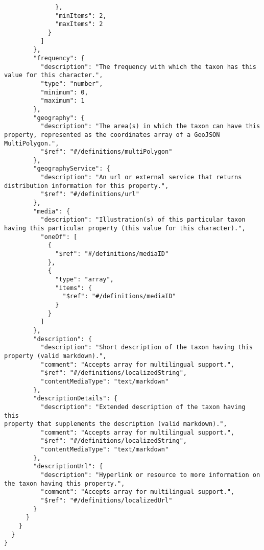 \documentclass[10pt,letterpaper]{article}
\begin{document}
\begin{verbatim}
              },
              "minItems": 2,
              "maxItems": 2
            }
          ]
        },
        "frequency": {
          "description": "The frequency with which the taxon has this
value for this character.",
          "type": "number",
          "minimum": 0,
          "maximum": 1
        },
        "geography": {
          "description": "The area(s) in which the taxon can have this
property, represented as the coordinates array of a GeoJSON
MultiPolygon.",
          "$ref": "#/definitions/multiPolygon"
        },
        "geographyService": {
          "description": "An url or external service that returns
distribution information for this property.",
          "$ref": "#/definitions/url"
        },
        "media": {
          "description": "Illustration(s) of this particular taxon
having this particular property (this value for this character).",
          "oneOf": [
            {
              "$ref": "#/definitions/mediaID"
            },
            {
              "type": "array",
              "items": {
                "$ref": "#/definitions/mediaID"
              }
            }
          ]
        },
        "description": {
          "description": "Short description of the taxon having this
property (valid markdown).",
          "comment": "Accepts array for multilingual support.",
          "$ref": "#/definitions/localizedString",
          "contentMediaType": "text/markdown"
        },
        "descriptionDetails": {
          "description": "Extended description of the taxon having this
property that supplements the description (valid markdown).",
          "comment": "Accepts array for multilingual support.",
          "$ref": "#/definitions/localizedString",
          "contentMediaType": "text/markdown"
        },
        "descriptionUrl": {
          "description": "Hyperlink or resource to more information on
the taxon having this property.",
          "comment": "Accepts array for multilingual support.",
          "$ref": "#/definitions/localizedUrl"
        }
      }
    }
  }
}

\end{verbatim}
\nolinenumbers
\end{document}
